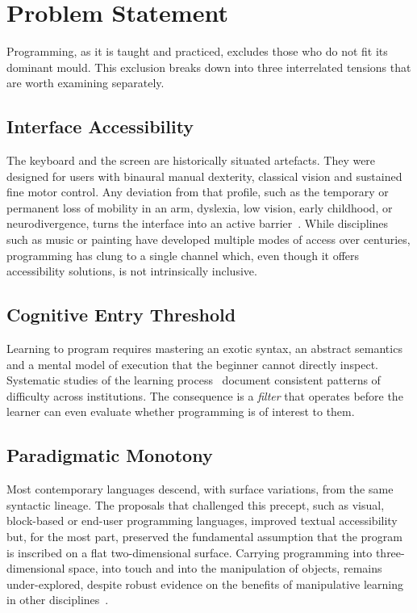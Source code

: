 
\chapter{Problem Statement}
\label{cha:problem}

Programming, as it is taught and practiced, excludes those who do not fit its dominant mould.
This exclusion breaks down into three interrelated tensions that are worth examining separately.

\section{Interface Accessibility}
\label{sec:problem:accessibility}
The keyboard and the screen are historically situated artefacts.
They were designed for users with binaural manual dexterity, classical vision and sustained fine motor control.
Any deviation from that profile, such as the temporary or permanent loss of mobility in an arm, dyslexia, low vision, early childhood, or neurodivergence, turns the interface into an active barrier~\cite{ko23,oleson23}.
While disciplines such as music or painting have developed multiple modes of access over centuries, programming has clung to a single channel which, even though it offers accessibility solutions, is not intrinsically inclusive.

\section{Cognitive Entry Threshold}
\label{sec:problem:cognitive}
Learning to program requires mastering an exotic syntax, an abstract semantics and a mental model of execution that the beginner cannot directly inspect.
Systematic studies of the learning process~\cite{bosse17,robins03} document consistent patterns of difficulty across institutions.
The consequence is a \emph{filter} that operates before the learner can even evaluate whether programming is of interest to them.

\section{Paradigmatic Monotony}
\label{sec:problem:monotony}
Most contemporary languages descend, with surface variations, from the same syntactic lineage.
The proposals that challenged this precept, such as visual, block-based or end-user programming languages, improved textual accessibility but, for the most part, preserved the fundamental assumption that the program is inscribed on a flat two-dimensional surface.
Carrying programming into three-dimensional space, into touch and into the manipulation of objects, remains under-explored, despite robust evidence on the benefits of manipulative learning in other disciplines~\cite{montessori12,marshall07}.

